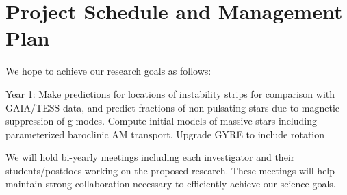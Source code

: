 \section{Project Schedule and Management Plan}

We hope to achieve our research goals as follows:

Year 1: Make predictions for locations of instability strips for comparison with GAIA/TESS data, and predict fractions of non-pulsating stars due to magnetic suppression of g modes. Compute initial models of massive stars including parameterized baroclinic AM transport.  Upgrade GYRE to include rotation

We will  hold bi-yearly meetings including each investigator and their students/postdocs working on the proposed research. These meetings will help maintain strong collaboration necessary to efficiently achieve our science goals.
